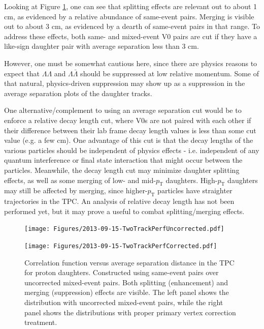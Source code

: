 Looking at Figure \ref{fig:TwoTrackPerf}, one can see that splitting effects are relevant out to about 1 cm, as evidenced by a relative abundance of same-event pairs.  
Merging is visible out to about 3 cm, as evidenced by a dearth of same-event pairs in that range.  
To address these effects, both same- and mixed-event V0 pairs are cut if they have a like-sign daughter pair with average separation less than 3 cm.  

However, one must be somewhat cautious here, since there are physics reasons to expect that $\Lambda\Lambda$ and $\Lambda\bar{\Lambda}$ should be suppressed at low relative momentum.  
Some of that natural, physics-driven suppression may show up as a suppression in the average separation plots of the daughter tracks.  

One alternative/complement to using an average separation cut would be to enforce a relative decay length cut, where V0s are not paired with each other if their difference between their lab frame decay length values is less than some cut value (e.g. a few cm).  
One advantage of this cut is that the decay lengths of the various particles should be independent of physics effects - i.e. independent of any quantum interference or final state interaction that might occur between the particles.  
Meanwhile, the decay length cut may minimize daughter splitting effects, as well as some merging of low- and mid-$p_{\mathrm{T}}$ daughters.  
High-$p_{\mathrm{T}}$ daughters may still be affected by merging, since higher-$p_{\mathrm{T}}$ particles have straighter trajectories in the TPC.  
An analysis of relative decay length has not been performed yet, but it may prove a useful to combat splitting/merging effects.




\begin{figure}[h]
\begin{minipage}{18pc}
\texttt{[image: Figures/2013-09-15-TwoTrackPerfUncorrected.pdf]}
\end{minipage}\hspace{2pc}
\begin{minipage}{18pc}
\texttt{[image: Figures/2013-09-15-TwoTrackPerfCorrected.pdf]}
\end{minipage} 
\caption[Two-track reconstruction effects]{\label{fig:TwoTrackPerf}Correlation function versus average separation distance in the TPC for proton daughters.  
Constructed using same-event pairs over uncorrected mixed-event pairs.  
Both splitting (enhancement) and merging (suppression) effects are visible. 
The left panel shows the distribution with uncorrected mixed-event pairs, while the right panel shows the distributions with proper primary vertex correction treatment.}
\end{figure}

